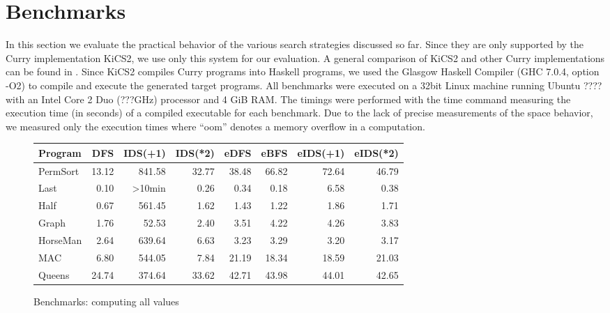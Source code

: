 \documentclass[english]{lni}
\begin{document}
\section{Benchmarks}
\label{sec:benchmarks}

In this section we evaluate the practical behavior
of the various search strategies discussed so far.
Since they are only supported by the Curry implementation KiCS2,
we use only this system for our evaluation.
A general comparison of KiCS2 and other Curry implementations
can be found in \cite{BrasselHanusPeemoellerReck11}.
Since KiCS2 compiles Curry programs into Haskell programs,
we used the Glasgow Haskell Compiler
(GHC 7.0.4, option -O2) to compile and execute
the generated target programs.
All benchmarks were executed on a 32bit Linux machine
running Ubuntu ???? with an Intel Core 2 Duo (???GHz) processor and 4 GiB RAM.
The timings were performed with the time command measuring the
execution time (in seconds) of a compiled executable for each benchmark.
Due to the lack of precise measurements of the space behavior,
we measured only the execution times where
``oom'' denotes a memory overflow in a computation.

\begin{figure}[ht]
\centering
\begin{tabular}{|@{~~}l@{~~}|*{7}{@{~~}r@{~~}|}}
\hline
Program     &   DFS  & IDS(+1) & IDS(*2) & eDFS  & eBFS  & eIDS(+1) & eIDS(*2) \\\hline
PermSort    &  13.12 &  841.58 &   32.77 & 38.48 & 66.82 &    72.64 &    46.79 \\
Last        &   0.10 & >10min  &    0.26 &  0.34 &  0.18 &     6.58 &     0.38 \\
Half        &   0.67 &  561.45 &    1.62 &  1.43 &  1.22 &     1.86 &     1.71 \\
Graph       &   1.76 &   52.53 &    2.40 & 3.51  & 4.22  &     4.26 &     3.83 \\
HorseMan    &   2.64 &  639.64 &    6.63 & 3.23  & 3.29  &     3.20 &     3.17 \\
MAC         &   6.80 &  544.05 &    7.84 & 21.19 & 18.34 &    18.59 &    21.03 \\
Queens      &  24.74 &  374.64 &   33.62 & 42.71 & 43.98 &    44.01 &    42.65
\hline
\end{tabular}
\caption{Benchmarks: computing all values}
\label{fig:bench-all-solutions}
\end{figure}
\end{document}
